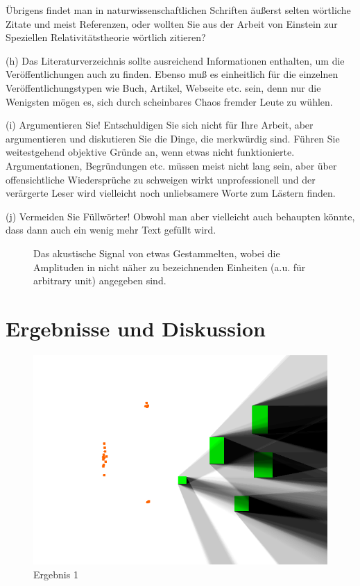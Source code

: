 \documentclass[10pt,twocolumn]{scrartcl}
\begin{document}
\begin{list}{-}{}
Übrigens findet man in naturwissenschaftlichen Schriften 
äußerst selten wörtliche Zitate und meist Referenzen, oder wollten Sie
aus der Arbeit von Einstein zur Speziellen Relativitätstheorie \cite{Einstein1905}
wörtlich zitieren?

\item[(h)] Das Literaturverzeichnis sollte ausreichend Informationen enthalten,
um die Veröffentlichungen auch zu finden. Ebenso muß es einheitlich für
die einzelnen Veröffentlichungstypen wie Buch, Artikel, Webseite etc. sein,
denn nur die Wenigsten mögen es, sich durch scheinbares Chaos fremder Leute zu wühlen.

\item[(i)] Argumentieren Sie! Entschuldigen Sie sich nicht für Ihre Arbeit, 
aber argumentieren und diskutieren Sie die Dinge, die merkwürdig sind.
Führen Sie weitestgehend objektive Gründe an, wenn etwas nicht funktionierte.
Argumentationen, Begründungen etc. müssen meist nicht lang sein, 
aber über offensichtliche Wiedersprüche zu schweigen wirkt unprofessionell 
und der verärgerte Leser wird vielleicht noch unliebsamere Worte 
zum Lästern finden.

\item[(j)] Vermeiden Sie Füllwörter! Obwohl man aber vielleicht auch behaupten
könnte, dass dann auch ein wenig mehr Text gefüllt wird.
\end{list}

\begin{figure}[t]
\centering
\caption{Das akustische Signal von etwas Gestammelten, wobei die Amplituden in 
nicht näher zu bezeichnenden Einheiten (a.u. für arbitrary unit) angegeben sind.}
\label{fig:audio}
\end{figure}

\section{Ergebnisse und Diskussion}

\begin{figure}[H]
	\centering
	\includegraphics[width=\columnwidth]{images/ergebnis_4.png}
	\caption{Ergebnis 1}
	\label{ergeb1}
\end{figure}
\end{document}
